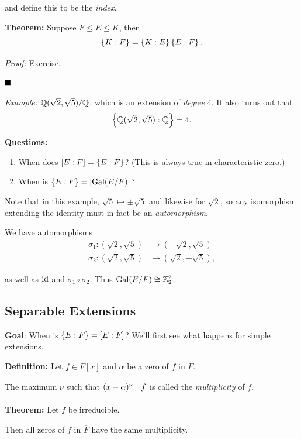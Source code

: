 and define this to be the \emph{index}.

\textbf{Theorem:} Suppose \(F \leq E \leq K\), then \[
\left\{{K: F}\right\} = \left\{{K: E}\right\} \left\{{E: F}\right\}.
\]

\emph{Proof:} Exercise.

\(\qed\)

\emph{Example:} \({\mathbb{Q}}(\sqrt 2, \sqrt 5)/{\mathbb{Q}}\), which is an extension of
\emph{degree} 4. It also turns out that \[
\left\{{{\mathbb{Q}}(\sqrt 2, \sqrt 5) : {\mathbb{Q}}}\right\} = 4.
\]

\textbf{Questions:}

\begin{enumerate}
\def\labelenumi{\arabic{enumi}.}
\item
  When does \([E: F] = \left\{{E: F}\right\}\)? (This is always true in
  characteristic zero.)
\item
  When is \(\left\{{E: F}\right\} = {\left\lvert {\mathrm{Gal}(E/F)} \right\rvert}\)?
\end{enumerate}

Note that in this example, \(\sqrt 5 \mapsto \pm \sqrt 5\) and likewise
for \(\sqrt 2\), so any isomorphism extending the identity must in fact
be an \emph{automorphism}.

We have automorphisms \begin{align*}
\sigma_1: (\sqrt 2, \sqrt 5) &\mapsto (-\sqrt 2,\sqrt 5) \\
\sigma_2: (\sqrt 2, \sqrt 5) &\mapsto (\sqrt 2, -\sqrt 5)
,\end{align*}

as well as \(\text{id}\) and \(\sigma_1 \circ \sigma_2\). Thus
\(\mathrm{Gal}(E/F) \cong {\mathbb{Z}}_2^2\).

\hypertarget{separable-extensions}{%
\subsection{Separable Extensions}\label{separable-extensions}}

\textbf{Goal}: When is \(\left\{{E: F}\right\} = [E: F]\)? We'll first see what
happens for simple extensions.

\textbf{Definition:} Let \(f \in F[x]\) and \(\alpha\) be a zero of
\(f\) in \(\overline F\).

The maximum \(\nu\) such that \((x-\alpha)^\nu {~\Bigm| ~} f\) is called
the \emph{multiplicity} of \(f\).

\textbf{Theorem:} Let \(f\) be irreducible.

Then all zeros of \(f\) in \(\overline F\) have the same multiplicity.

